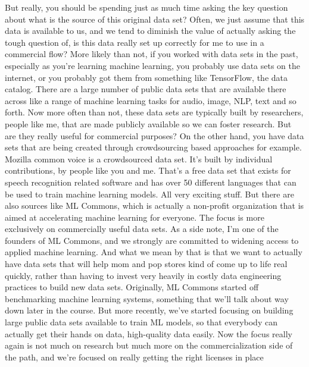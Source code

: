     But really, you should be spending just as much time asking the key question
    about what is the source of this original data set?
    Often, we just assume that this data is available to us,
    and we tend to diminish the value of actually asking the tough question of,
    is this data really set up correctly for me to use in a commercial flow?
    More likely than not, if you worked with data sets in the past,
    especially as you're learning machine learning,
    you probably use data sets on the internet,
    or you probably got them from something like TensorFlow, the data catalog.
    There are a large number of public data sets
    that are available there across like a range of machine
    learning tasks for audio, image, NLP, text and so forth.
    Now more often than not, these data sets are typically
    built by researchers, people like me, that are made publicly available so we
    can foster research.
    But are they really useful for commercial purposes?
    On the other hand, you have data sets that
    are being created through crowdsourcing based approaches for example.
    Mozilla common voice is a crowdsourced data set.
    It's built by individual contributions, by people like you and me.
    That's a free data set that exists for speech recognition related software
    and has over 50 different languages that can be
    used to train machine learning models.
    All very exciting stuff.
    But there are also sources like ML Commons, which is actually
    a non-profit organization that is aimed at accelerating machine learning
    for everyone.
    The focus is more exclusively on commercially useful data sets.
    As a side note, I'm one of the founders of ML Commons,
    and we strongly are committed to widening access to applied machine
    learning.
    And what we mean by that is that we want to actually have data
    sets that will help mom and pop stores kind of come up to life real quickly,
    rather than having to invest very heavily in costly data
    engineering practices to build new data sets.
    Originally, ML Commons started off benchmarking machine
    learning systems, something that we'll talk
    about way down later in the course.
    But more recently, we've started focusing
    on building large public data sets available to train ML models,
    so that everybody can actually get their hands on data, high-quality data
    easily.
    Now the focus really again is not much on research but much more
    on the commercialization side of the path,
    and we're focused on really getting the right licenses in place
